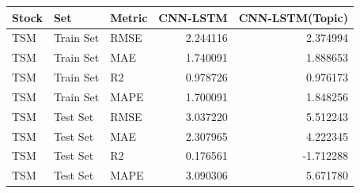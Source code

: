 \begin{tabular}{lllrr}
\toprule
Stock & Set & Metric & CNN-LSTM & CNN-LSTM(Topic) \\
\midrule
TSM & Train Set & RMSE & 2.244116 & 2.374994 \\
TSM & Train Set & MAE & 1.740091 & 1.888653 \\
TSM & Train Set & R2 & 0.978726 & 0.976173 \\
TSM & Train Set & MAPE & 1.700091 & 1.848256 \\
TSM & Test Set & RMSE & 3.037220 & 5.512243 \\
TSM & Test Set & MAE & 2.307965 & 4.222345 \\
TSM & Test Set & R2 & 0.176561 & -1.712288 \\
TSM & Test Set & MAPE & 3.090306 & 5.671780 \\
\bottomrule
\end{tabular}
